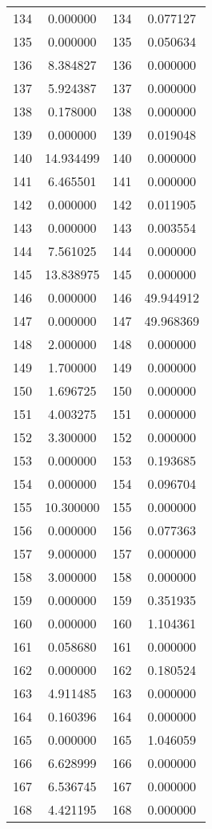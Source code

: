 \documentclass[12pt]{article}
\begin{document}
\begin{longtable}{@{}cccc@{}}
134 & 0.000000 & 134 & 0.077127 \\
135 & 0.000000 & 135 & 0.050634 \\
136 & 8.384827 & 136 & 0.000000 \\
137 & 5.924387 & 137 & 0.000000 \\
138 & 0.178000 & 138 & 0.000000 \\
139 & 0.000000 & 139 & 0.019048 \\
140 & 14.934499 & 140 & 0.000000 \\
141 & 6.465501 & 141 & 0.000000 \\
142 & 0.000000 & 142 & 0.011905 \\
143 & 0.000000 & 143 & 0.003554 \\
144 & 7.561025 & 144 & 0.000000 \\
145 & 13.838975 & 145 & 0.000000 \\
146 & 0.000000 & 146 & 49.944912 \\
147 & 0.000000 & 147 & 49.968369 \\
148 & 2.000000 & 148 & 0.000000 \\
149 & 1.700000 & 149 & 0.000000 \\
150 & 1.696725 & 150 & 0.000000 \\
151 & 4.003275 & 151 & 0.000000 \\
152 & 3.300000 & 152 & 0.000000 \\
153 & 0.000000 & 153 & 0.193685 \\
154 & 0.000000 & 154 & 0.096704 \\
155 & 10.300000 & 155 & 0.000000 \\
156 & 0.000000 & 156 & 0.077363 \\
157 & 9.000000 & 157 & 0.000000 \\
158 & 3.000000 & 158 & 0.000000 \\
159 & 0.000000 & 159 & 0.351935 \\
160 & 0.000000 & 160 & 1.104361 \\
161 & 0.058680 & 161 & 0.000000 \\
162 & 0.000000 & 162 & 0.180524 \\
163 & 4.911485 & 163 & 0.000000 \\
164 & 0.160396 & 164 & 0.000000 \\
165 & 0.000000 & 165 & 1.046059 \\
166 & 6.628999 & 166 & 0.000000 \\
167 & 6.536745 & 167 & 0.000000 \\
168 & 4.421195 & 168 & 0.000000 \\

\end{longtable}
\end{document}

